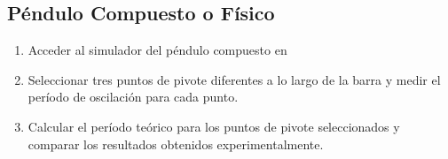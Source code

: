 \documentclass[twocolumn, 12pt]{article}
\begin{document}
\subsection{Péndulo Compuesto o Físico}

\begin{enumerate}
    \item Acceder al simulador del péndulo compuesto
          en~\cite{simulador-pendulo-fisico}

    \item Seleccionar tres puntos de pivote diferentes a lo largo de
          la barra y medir el período de oscilación para cada punto.
    \item Calcular el período teórico para los puntos de pivote
          seleccionados y comparar los resultados obtenidos
          experimentalmente.
\end{enumerate}

\printbibliography
\end{document}
